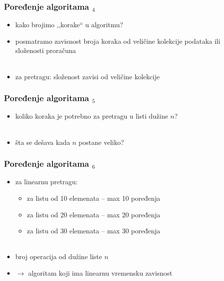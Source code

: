 \documentclass[utf8,compress,aspectratio=169]{beamer}
\begin{document}
\begin{frame}[fragile]
  \frametitle{Poređenje algoritama $_4$}
  \begin{itemize}
    \item kako brojimo ,,korake`` u algoritmu?
    \item posmatramo zavisnost broja koraka od veličine kolekcije
      podataka ili složenosti proračuna \\ \ \\
    \item za pretragu: složenost zavisi od veličine kolekcije
  \end{itemize}
\end{frame}

\begin{frame}[fragile]
  \frametitle{Poređenje algoritama $_5$}
  \begin{itemize}
    \item koliko koraka je potrebno za pretragu u listi dužine $n$? \\ \ \\
    \item šta se dešava kada $n$ postane veliko?
  \end{itemize}
\end{frame}

\begin{frame}[fragile]
  \frametitle{Poređenje algoritama $_6$}
  \begin{itemize}
    \item za linearnu pretragu:
    \begin{itemize}
      \item za listu od 10 elemenata -- max 10 poređenja
      \item za listu od 20 elemenata -- max 20 poređenja
      \item za listu od 30 elemenata -- max 30 poređenja \\ \ \\
    \end{itemize}
    \item broj operacija  od dužine liste $n$
    \item $\rightarrow$ algoritam koji ima linearnu vremensku zavisnost
  \end{itemize}
\end{frame}
\end{document}
